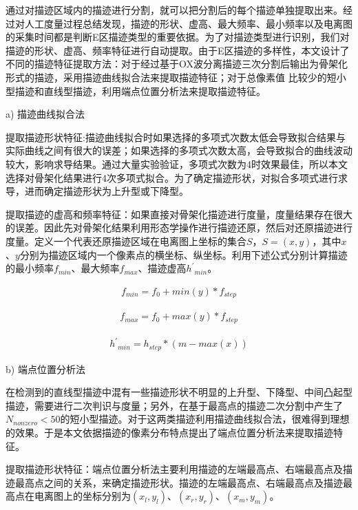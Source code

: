 通过对描迹区域内的描迹进行分割，就可以把分割后的每个描迹单独提取出来。经过对人工度量过程总结发现，描迹的形状、虚高、最大频率、最小频率以及电离图的采集时间都是判断E区描迹类型的重要依据。为了对描迹类型进行识别，我们对描迹的形状、虚高、频率特征进行自动提取。由于E区描迹的多样性，本文设计了不同的描迹特征提取方法：对于经过基于OX波分离描迹三次分割后输出为骨架化形式的描迹，采用描迹曲线拟合法来提取描迹特征；对于总像素值 比较少的短小型描迹和直线型描迹，利用端点位置分析法来提取描迹特征。

a) 描迹曲线拟合法

提取描迹形状特征:描迹曲线拟合时如果选择的多项式次数太低会导致拟合结果与实际曲线之间有很大的误差；如果选择的多项式次数太高，会导致拟合的曲线波动较大，影响求导结果。通过大量实验验证，多项式次数为4时效果最佳，所以本文选择对骨架化结果进行4次多项式拟合。为了确定描迹形状，对拟合多项式进行求导，进而确定描迹形状为上升型或下降型。

提取描迹的虚高和频率特征：如果直接对骨架化描迹进行度量，度量结果存在很大的误差。因此先对骨架化结果利用形态学操作进行描迹还原，然后对还原描迹进行度量。定义一个代表还原描迹区域在电离图上坐标的集合$S$，$S = {(x, y)}$，其中$x$、$y$分别为描迹区域内一个像素点的横坐标、纵坐标。利用下述公式分别计算描迹的最小频率$f_{min}$、最大频率$f_{max}$、描迹虚高${h^{'}}_{min}$。

\begin{linenomath}
\begin{align}
f_{min} = f_{0} + min(y)*f_{step}
\label{式4_25}
\end{align}
\end{linenomath}
\begin{linenomath}
\begin{align}
f_{max} = f_{0} + max(y)*f_{step}
\label{式4_26}
\end{align}
\end{linenomath}
\begin{linenomath}
\begin{align}
{h^{'}}_{min} = h_{step}*(m-max(x))
\label{式4_27}
\end{align}
\end{linenomath}


b) 端点位置分析法

在检测到的直线型描迹中混有一些描迹形状不明显的上升型、下降型、中间凸起型描迹，需要进行二次判识与度量；另外，在基于最高点的描迹二次分割中产生了$N_{nonzero}<50$的短小型描迹。对于这两类描迹利用描迹曲线拟合法，很难得到理想的效果。于是本文依据描迹的像素分布特点提出了端点位置分析法来提取描迹特征。

提取描迹形状特征：端点位置分析法主要利用描迹的左端最高点、右端最高点及描迹最高点之间的关系，来确定描迹形状。描迹的左端最高点、右端最高点及描迹最高点在电离图上的坐标分别为$(x_{l}, y_{l})$、$(x_{r}, y_{r})$、$(x_{m}, y_{m})$。

